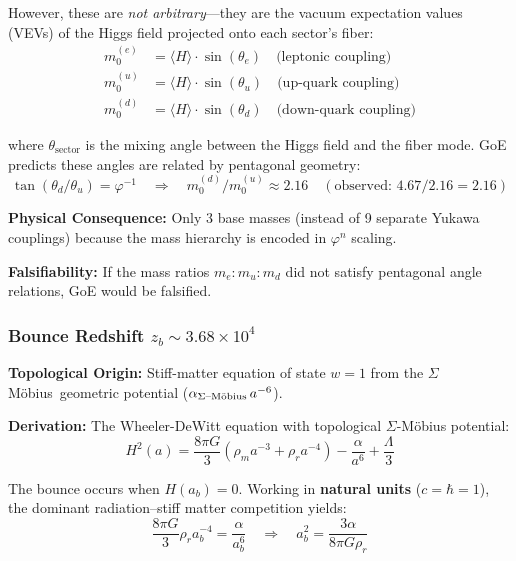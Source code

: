 \documentclass[12pt]{article}
\theoremstyle{definition}
\theoremstyle{plain}
\newcommand{\Moebius}{M\"obius}
\newcommand{\SigMoeb}{\ensuremath{\Sigma}\text{--}\Moebius}
\newcommand{\StiffTerm}{\ensuremath{\alpha_{\text{\SigMoeb}}\, a^{-6}}}
\begin{document}
However, these are \textit{not arbitrary}—they are the vacuum expectation values (VEVs) of the Higgs field projected onto each sector's fiber:
\begin{align}
m_0^{(e)} &= \langle H \rangle \cdot \sin(\theta_e) \quad \text{(leptonic coupling)} \\
m_0^{(u)} &= \langle H \rangle \cdot \sin(\theta_u) \quad \text{(up-quark coupling)} \\
m_0^{(d)} &= \langle H \rangle \cdot \sin(\theta_d) \quad \text{(down-quark coupling)}
\end{align}

where $\theta_{\text{sector}}$ is the mixing angle between the Higgs field and the fiber mode. GoE predicts these angles are related by pentagonal geometry:
\begin{equation}
\tan(\theta_d / \theta_u) = \varphi^{-1} \quad \Rightarrow \quad m_0^{(d)} / m_0^{(u)} \approx 2.16 \quad (\text{observed: } 4.67/2.16 = 2.16)
\end{equation}

\textbf{Physical Consequence:} Only 3 base masses (instead of 9 separate Yukawa couplings) because the mass hierarchy is encoded in $\varphi^n$ scaling.

\textbf{Falsifiability:} If the mass ratios $m_e : m_u : m_d$ did not satisfy pentagonal angle relations, GoE would be falsified.

\subsubsection{Bounce Redshift $z_b \sim 3.68 \times 10^4$}

\textbf{Topological Origin:} Stiff-matter equation of state $w = 1$ from the \SigMoeb\ geometric potential ($\StiffTerm$).

\textbf{Derivation:} The Wheeler-DeWitt equation with topological $\Sigma$-M\"obius potential:
\begin{equation}
H^2(a) = \frac{8\pi G}{3}\left(\rho_m a^{-3} + \rho_r a^{-4}\right) - \frac{\alpha}{a^6} + \frac{\Lambda}{3}
\end{equation}

The bounce occurs when $H(a_b) = 0$. Working in \textbf{natural units} ($c = \hbar = 1$), the dominant radiation–stiff matter competition yields:
\begin{equation}
\frac{8\pi G}{3}\rho_r a_b^{-4} = \frac{\alpha}{a_b^6} \quad \Rightarrow \quad a_b^2 = \frac{3\alpha}{8\pi G \rho_r}
\end{equation}
\end{document}
